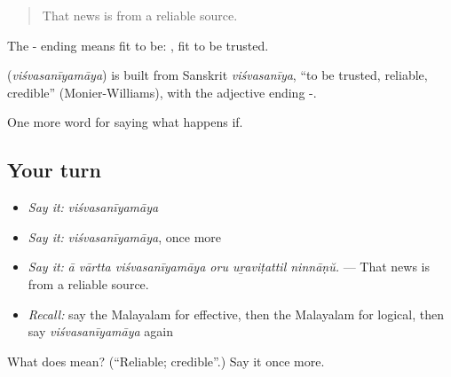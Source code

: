 \begin{quote}
That news is from a reliable source.
\end{quote}

The - ending means fit to be: , fit to be trusted.

\begin{cousinweb}
\textbf{} (\emph{viśvasanīyamāya}) is built from Sanskrit \emph{viśvasanīya}, \textquotedblleft{}to be trusted, reliable, credible\textquotedblright{} (Monier-Williams), with the adjective ending -.
\end{cousinweb}

\begin{grammarlens}[title={What you've built}]
One more word for saying what happens if.
\end{grammarlens}

\subsection*{Your turn}
\begin{itemize}
\raggedright
  \item \emph{Say it:} \emph{viśvasanīyamāya}
  \item \emph{Say it:} \emph{viśvasanīyamāya}, once more
  \item \emph{Say it:} \emph{ā vārtta viśvasanīyamāya oru uṟaviṭattil ninnāṇŭ.} — That news is from a reliable source.
  \item \emph{Recall:} say the Malayalam for effective, then the Malayalam for logical, then say \emph{viśvasanīyamāya} again
\end{itemize}

\begin{tcolorbox}[breakable,colback=teal!4,colframe=teal!35!black,title={Before you move on}]
What does  mean? (\textquotedblleft{}Reliable; credible\textquotedblright{}.) Say it once more.
\end{tcolorbox}
